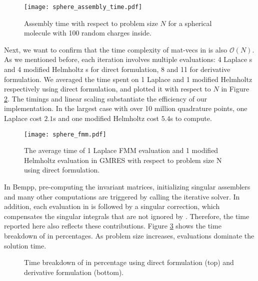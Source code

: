 \begin{figure}%
    \centering
    \texttt{[image: sphere\_assembly\_time.pdf]} 
    \caption{Assembly time with respect to problem size $N$ for a spherical molecule with 100 random charges inside.}
    \label{fig:sphere_assembly_time}
\end{figure}

Next, we want to confirm that the time complexity of mat-vecs in \gmres is also $\mathcal{O}(N)$.
As we mentioned before, each iteration involves multiple \fmm evaluations: 4 Laplace {\fmm}s and 4 modified Helmholtz {\fmm}s for direct formulation, 8 and 11 for derivative formulation.
We averaged the time spent on 1 Laplace \fmm and 1 modified Helmholtz \fmm respectively using direct formulation, and plotted it with respect to $N$ in Figure \ref{fig:sphere_fmm}.
The timings and linear scaling substantiate the efficiency of our \fmm implementation.
In the largest case with over 10 million quadrature points, one Laplace \fmm cost $2.1$s and one modified Helmholtz \fmm cost $5.4$s to compute.


\begin{figure}%
    \centering
    \texttt{[image: sphere\_fmm.pdf]} 
    \caption{The average time of 1 Laplace FMM evaluation and 1 modified Helmholtz evaluation in GMRES with respect to problem size N using direct formulation.}
    \label{fig:sphere_fmm}
\end{figure}

In Bempp, pre-computing the \fmm invariant matrices, initializing singular assemblers and many other computations are triggered by calling the iterative solver.
In addition, each \fmm evaluation in \gmres is followed by a singular correction, which compensates the singular integrals that are not ignored by \fmm.
Therefore, the \gmres time reported here also reflects these contributions.
Figure \ref{fig:sphere_gmres} shows the time breakdown of \gmres in percentages.
As problem size increases, \fmm evaluations dominate the solution time.

\begin{figure}%
    \begin{subfigure}{\columnwidth}
        \centering
    \end{subfigure}

    \begin{subfigure}{\columnwidth}
        \centering
    \end{subfigure}

    \caption{Time breakdown of \gmres in percentage using direct formulation (top) and derivative formulation (bottom).}
    \label{fig:sphere_gmres}
\end{figure}

